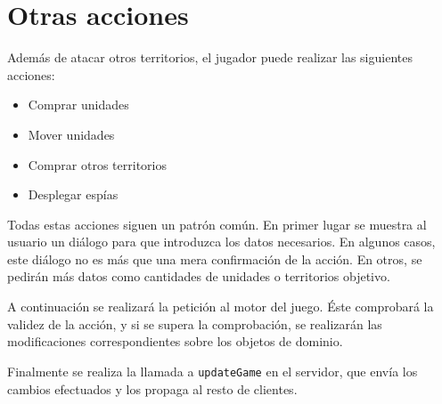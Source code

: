 \section{Otras acciones}

Además de atacar otros territorios, el jugador puede realizar las siguientes
acciones:

\begin{itemize}
\item Comprar unidades
\item Mover unidades
\item Comprar otros territorios
\item Desplegar espías
\end{itemize}

Todas estas acciones siguen un patrón común. En primer lugar se muestra al
usuario un diálogo para que introduzca los datos necesarios. En algunos casos,
este diálogo no es más que una mera confirmación de la acción. En otros, se
pedirán más datos como cantidades de unidades o territorios objetivo.

A continuación se realizará la petición al motor del juego. Éste comprobará la
validez de la acción, y si se supera la comprobación, se realizarán las
modificaciones correspondientes sobre los objetos de dominio.

Finalmente se realiza la llamada a \texttt{updateGame} en el servidor, que
envía los cambios efectuados y los propaga al resto de clientes.